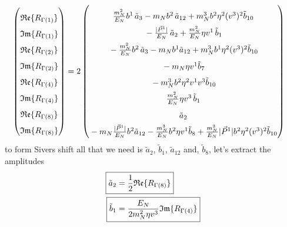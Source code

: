 \documentclass[]{article}
\numberwithin{equation}{section}
\newcommand{\bvec}{b}
\newcommand{\mN}{m_N}
\begin{document}
\begin{align}
    \begin{pmatrix}
        \rule{0pt}{16pt} \mathfrak{Re}\{ R_{\Gamma(1)}\} \\
        \rule{0pt}{16pt} \mathfrak{Im}\{ R_{\Gamma(1)}\} \\
        \rule{0pt}{16pt} \mathfrak{Re}\{ R_{\Gamma(2)}\} \\
        \rule{0pt}{16pt} \mathfrak{Im}\{ R_{\Gamma(2)}\} \\
        \rule{0pt}{16pt} \mathfrak{Re}\{ R_{\Gamma(4)}\} \\
        \rule{0pt}{16pt} \mathfrak{Im}\{ R_{\Gamma(4)}\} \\
        \rule{0pt}{16pt} \mathfrak{Re}\{ R_{\Gamma(8)}\} \\
        \rule{0pt}{16pt} \mathfrak{Im}\{ R_{\Gamma(8)}\}
    \end{pmatrix} &= 2\begin{pmatrix}
     \rule{0pt}{16pt}   \frac{\mN^2}{E_N} \bvec^1\, \tilde a_3-  \mN  \bvec^2 \, \tilde a_{12}+  \mN^3  \bvec^2 \eta^2 (v^3)^2 \tilde b_{10}\\
      \rule{0pt}{16pt}  -\frac{|\vec{P}^1|}{E_N}\, \tilde a_2+ \frac{\mN^2}{E_N} \eta v^1\, \tilde b_1 \\
      \rule{0pt}{16pt}  -  \frac{\mN^2}{E_N} \bvec^2\, \tilde a_3
		-  \mN   \bvec^1  \tilde a_{12}+ \mN^3  \bvec^1 \eta^2 (v^3)^2 \tilde b_{10}\\
      \rule{0pt}{16pt} - \mN \eta v^1  \tilde b_7\\
      \rule{0pt}{16pt} -\mN^3 \bvec^2 \eta^2 v^1 v^3\tilde b_{10}\\
      \rule{0pt}{16pt} \frac{\mN^2}{E_N} \eta v^3\, \tilde b_1\\
      \rule{0pt}{16pt}  \tilde a_2\\
      \rule{0pt}{16pt} -  \mN  \frac{|\vec{P}^1|}{E_N} \bvec^2  \tilde a_{12}- \frac{  \mN^3}{E_N}  \bvec^2 \eta v^1  \tilde b_8+ \frac{ \mN^3}{E_N}  |\vec{P}^1| \bvec^2 \eta^2 (v^3)^2 \tilde b_{10}
    \end{pmatrix}
\end{align}
to form Sivers shift all that we need is $\tilde a_2$, $\tilde b_1$, $\tilde a_{12}$ and, $\tilde b_8$, let's extract the amplitudes 
\begin{align}
    \Aboxed{\tilde a_2 = & \frac{1}{2}\mathfrak{Re}\{ R_{\Gamma(8)}\} }\\
    \Aboxed{\tilde b_1 = & \frac{E_{N}}{2\mN^2 \eta v^3} \mathfrak{Im}\{ R_{\Gamma(4)}\}}
\end{align}
\end{document}
